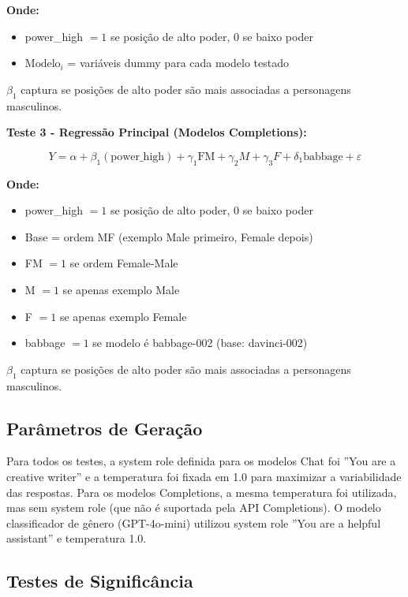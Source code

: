 \documentclass[12pt,a4paper]{article}
\begin{document}
\textbf{Onde:}
\begin{itemize}
\item power\_high $= 1$ se posição de alto poder, 0 se baixo poder
\item $\text{Modelo}_i$ = variáveis dummy para cada modelo testado
\end{itemize}

$\beta_1$ captura se posições de alto poder são mais associadas a personagens
masculinos.

\textbf{Teste 3 - Regressão Principal (Modelos Completions):}

\begin{equation}
Y = \alpha + \beta_1(\text{power\_high}) + \gamma_1 \text{FM} + \gamma_2 M + \gamma_3 F + \delta_1 \text{babbage} + \varepsilon
\end{equation}

\textbf{Onde:}
\begin{itemize}
\item power\_high $= 1$ se posição de alto poder, 0 se baixo poder
\item Base = ordem MF (exemplo Male primeiro, Female depois)
\item FM $= 1$ se ordem Female-Male
\item M $= 1$ se apenas exemplo Male
\item F $= 1$ se apenas exemplo Female
\item babbage $= 1$ se modelo é babbage-002 (base: davinci-002)
\end{itemize}

$\beta_1$ captura se posições de alto poder são mais associadas a personagens
masculinos.


\subsection{Parâmetros de Geração}


Para todos os testes, a system role definida para os modelos Chat foi
''You are a creative writer'' e a temperatura foi fixada em 1.0 para
maximizar a variabilidade das respostas. Para os modelos Completions, a
mesma temperatura foi utilizada, mas sem system role (que não é
suportada pela API Completions). O modelo classificador de gênero
(GPT-4o-mini) utilizou system role ''You are a helpful assistant'' e
temperatura 1.0.


\subsection{Testes de Significância}
\end{document}
